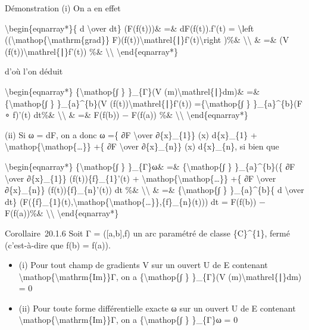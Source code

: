 \documentclass[]{article}
\begin{document}
Démonstration (i) On a en effet

\textbackslash{}begin\{eqnarray*\}\{ d \textbackslash{}over dt\}
(F(f(t)))\& =\& dF(f(t)).f'(t) = \textbackslash{}left
((\textbackslash{}mathop\{\textbackslash{}mathrm\{grad\}\}
F)(f(t))\textbackslash{}mathrel\{∣\}f'(t)\textbackslash{}right )\%\&
\textbackslash{}\textbackslash{} \& =\& (V
(f(t))\textbackslash{}mathrel\{∣\}f'(t)) \%\&
\textbackslash{}\textbackslash{} \textbackslash{}end\{eqnarray*\}

d'où l'on déduit

\textbackslash{}begin\{eqnarray*\} \{\textbackslash{}mathop\{∫ \}
\}\_\{Γ\}(V (m)\textbackslash{}mathrel\{∣\}dm)\& =\&
\{\textbackslash{}mathop\{∫ \} \}\_\{a\}\^{}\{b\}(V
(f(t))\textbackslash{}mathrel\{∣\}f'(t)) =\{\textbackslash{}mathop\{∫ \}
\}\_\{a\}\^{}\{b\}(F ∘ f)'(t) dt\%\& \textbackslash{}\textbackslash{} \&
=\& F(f(b)) − F(f(a)) \%\& \textbackslash{}\textbackslash{}
\textbackslash{}end\{eqnarray*\}

(ii) Si ω = dF, on a donc ω =\{ ∂F \textbackslash{}over ∂\{x\}\_\{1\}\}
(x) d\{x\}\_\{1\} +
\textbackslash{}mathop\{\textbackslash{}mathop\{\ldots{}\}\} +\{ ∂F
\textbackslash{}over ∂\{x\}\_\{n\}\} (x) d\{x\}\_\{n\}, si bien que

\textbackslash{}begin\{eqnarray*\} \{\textbackslash{}mathop\{∫ \}
\}\_\{Γ\}ω\& =\& \{\textbackslash{}mathop\{∫ \} \}\_\{a\}\^{}\{b\}(\{ ∂F
\textbackslash{}over ∂\{x\}\_\{1\}\} (f(t))\{f\}\_\{1\}'(t) +
\textbackslash{}mathop\{\textbackslash{}mathop\{\ldots{}\}\} +\{ ∂F
\textbackslash{}over ∂\{x\}\_\{n\}\} (f(t))\{f\}\_\{n\}'(t)) dt \%\&
\textbackslash{}\textbackslash{} \& =\& \{\textbackslash{}mathop\{∫ \}
\}\_\{a\}\^{}\{b\}\{ d \textbackslash{}over dt\}
(F(\{f\}\_\{1\}(t),\textbackslash{}mathop\{\textbackslash{}mathop\{\ldots{}\}\},\{f\}\_\{n\}(t)))
dt = F(f(b)) − F(f(a))\%\& \textbackslash{}\textbackslash{}
\textbackslash{}end\{eqnarray*\}

Corollaire~20.1.6 Soit Γ = ({[}a,b{]},f) un arc paramétré de classe
\{C\}\^{}\{1\}, fermé (c'est-à-dire que f(b) = f(a)).

\begin{itemize}
\itemsep1pt\parskip0pt
\item
  (i) Pour tout champ de gradients V sur un ouvert U de E contenant
  \textbackslash{}mathop\{\textbackslash{}mathrm\{Im\}\}Γ, on a
  \{\textbackslash{}mathop\{∫ \} \}\_\{Γ\}(V
  (m)\textbackslash{}mathrel\{∣\}dm) = 0
\item
  (ii) Pour toute forme différentielle exacte ω sur un ouvert U de E
  contenant \textbackslash{}mathop\{\textbackslash{}mathrm\{Im\}\}Γ, on
  a \{\textbackslash{}mathop\{∫ \} \}\_\{Γ\}ω = 0
\end{itemize}
\end{document}
